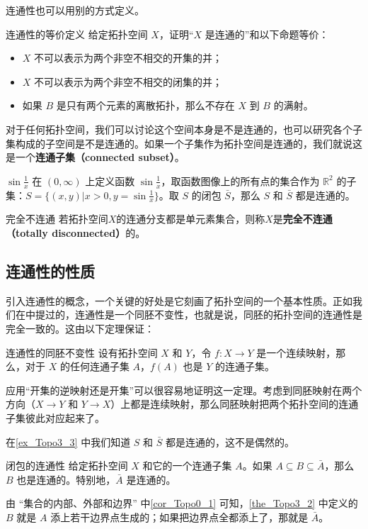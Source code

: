 连通性也可以用别的方式定义。

\begin{exercise}{连通性的等价定义}\label{exe_Topo3_1}
给定拓扑空间 $X$，证明“$X$ 是连通的”和以下命题等价：
\begin{itemize}
\item $X$ 不可以表示为两个非空不相交的开集的并；
\item $X$ 不可以表示为两个非空不相交的闭集的并；
\item 如果 $B$ 是只有两个元素的离散拓扑，那么不存在 $X$ 到 $B$ 的满射。

\end{itemize}
\end{exercise}

对于任何拓扑空间，我们可以讨论这个空间本身是不是连通的，也可以研究各个子集构成的子空间是不是连通的。如果一个子集作为拓扑空间是连通的，我们就说这是一个\textbf{连通子集（connected subset）}。

\begin{example}{$\sin{\frac{1}{x}}$}\label{ex_Topo3_3}
在 $(0,\infty)$ 上定义函数 $\sin{\frac{1}{x}}$，取函数图像上的所有点的集合作为 $\mathbb{R}^2$ 的子集：$S=\{(x, y)|x>0, y=\sin{\frac{1}{x}}\}$。取 $S$ 的闭包 $\bar{S}$，那么 $S$ 和 $\bar{S}$ 都是连通的。
\end{example}


\begin{definition}{完全不连通}
若拓扑空间$X$的连通分支都是单元素集合，则称$X$是\textbf{完全不连通（totally disconnected）}的。
\end{definition}








\subsection{连通性的性质}

引入连通性的概念，一个关键的好处是它刻画了拓扑空间的一个基本性质。正如我们在中提过的，连通性是一个同胚不变性，也就是说，同胚的拓扑空间的连通性是完全一致的。这由以下定理保证：

\begin{theorem}{连通性的同胚不变性}\label{the_Topo3_1}
设有拓扑空间 $X$ 和 $Y$，令 $f:X\rightarrow Y$ 是一个连续映射，那么，对于 $X$ 的任何连通子集 $A$，$f(A)$ 也是 $Y$ 的连通子集。
\end{theorem}

应用“开集的逆映射还是开集”可以很容易地证明这一定理。考虑到同胚映射在两个方向（$X\rightarrow Y$ 和 $Y\rightarrow X$）上都是连续映射，那么同胚映射把两个拓扑空间的连通子集彼此对应起来了。

在\autoref{ex_Topo3_3} 中我们知道 $S$ 和 $\bar{S}$ 都是连通的，这不是偶然的。

\begin{theorem}{闭包的连通性}\label{the_Topo3_2}
给定拓扑空间 $X$ 和它的一个连通子集 $A$。如果 $A\subseteq B\subseteq\bar{A}$，那么 $B$ 也是连通的。特别地，$\bar{A}$ 是连通的。
\end{theorem}

由 “集合的内部、外部和边界” 中\autoref{cor_Topo0_1} 可知，\autoref{the_Topo3_2} 中定义的 $B$ 就是 $A$ 添上若干边界点生成的；如果把边界点全都添上了，那就是 $\bar{A}$。
